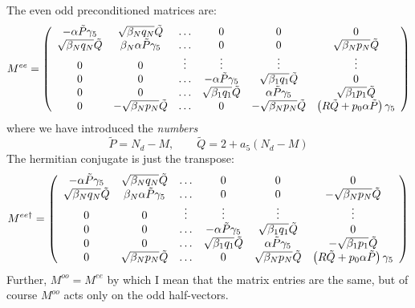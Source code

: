 \documentclass[12pt]{article}
\begin{document}
The even odd preconditioned matrices are:
\begin{equation}
M^{ee}=\left( \begin{array}{cccccc}
-\alpha \tilde{P} \gamma_5 & \sqrt{\beta_N q_N}\tilde{Q} & \ldots & 0 & 0 & 0 \\
\sqrt{\beta_N q_N}\tilde{Q} & \beta_N \alpha \tilde{P}\gamma_5 & \ldots & 0 & 0 & \sqrt{\beta_N p_N}\tilde{Q} \\
 0 & 0 & \vdots & \vdots & \vdots & \vdots  \\
0 & 0 & \ldots & -\alpha \tilde{P} \gamma_5 & \sqrt{\beta_1 q_1}\tilde{Q} & 0 \\
0 & 0 & \ldots & \sqrt{\beta_1 q_1}\tilde{Q} & \alpha \tilde{P} \gamma_5 &  \sqrt{\beta_1 p_1}\tilde{Q} \\
0 & -\sqrt{\beta_N p_N}\tilde{Q}& \ldots & 0 & -\sqrt{\beta_N p_N}\tilde{Q} & \left( R \tilde{Q} + p_0 \alpha \tilde{P} \right)\gamma_5
\end{array} \right)
\end{equation}
where we have introduced the {\em numbers}
\begin{equation}
\tilde{P} = N_d - M, \qquad \tilde{Q} = 2 + a_5(N_d-M)
\end{equation}
The hermitian conjugate is just the transpose:
\begin{equation}
M^{ee \dagger}=\left( \begin{array}{cccccc}
-\alpha \tilde{P} \gamma_5 & \sqrt{\beta_N q_N}\tilde{Q} & \ldots & 0 & 0 & 0 \\
\sqrt{\beta_N q_N}\tilde{Q} & \beta_N \alpha \tilde{P}\gamma_5 & \ldots & 0 & 0 & -\sqrt{\beta_N p_N}\tilde{Q} \\
 0 & 0 & \vdots & \vdots & \vdots & \vdots  \\
0 & 0 & \ldots & -\alpha \tilde{P} \gamma_5 & \sqrt{\beta_1 q_1}\tilde{Q} & 0 \\
0 & 0 & \ldots & \sqrt{\beta_1 q_1}\tilde{Q} & \alpha \tilde{P} \gamma_5 &  -\sqrt{\beta_1 p_1}\tilde{Q} \\
0 & \sqrt{\beta_N p_N}\tilde{Q}& \ldots & 0 & \sqrt{\beta_N p_N}\tilde{Q} & \left( R \tilde{Q} + p_0 \alpha \tilde{P} \right)\gamma_5
\end{array} \right)
\end{equation}
Further, $M^{oo}=M^{ee}$ by which I mean that the matrix
entries are the same, but of course $M^{oo}$ acts only on the 
odd half-vectors.
\end{document}
